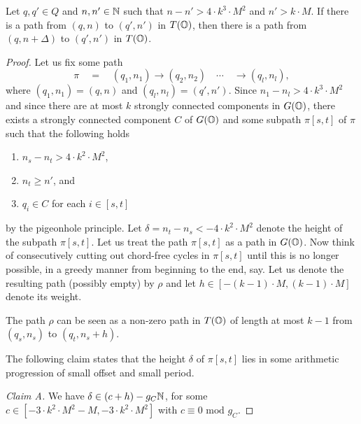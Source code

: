 \documentclass[times,envcountsame]{llncs}
\begin{document}
\begin{lemma}
Let $q,q'\in Q$ and $n,n'\in\mathbb{N}$ such that
$n-n'>4\cdot k^3\cdot M^2$ and
$n'>k\cdot M$.
If there is a path from $(q,n)$ to $(q',n')$ in $T(\mathbb{O})$, then there
is a path from $(q,n+\Delta)$ to $(q',n')$ in $T(\mathbb{O})$.
\end{lemma}
\begin{proof}
Let us fix some path
$$
\pi\quad=\quad(q_1,n_1)\rightarrow(q_2,n_2)\quad \cdots\quad \rightarrow (q_l,n_l),
$$
where $(q_1,n_1)=(q,n)$ and $(q_l,n_l)=(q',n')$.
Since $n_1-n_l>4\cdot k^3\cdot M^2$ and since there are at most $k$ strongly connected components in $G(\mathbb{O})$,  there
exists a strongly connected component $C$ of $G(\mathbb{O})$ and some subpath $\pi[s,t]$
of $\pi$ such that the following holds
\begin{enumerate}
\item  $n_s-n_t>4\cdot k^2\cdot M^2$,
\item $n_t\geq n'$, and
\item $q_i\in C$ for each $i\in[s,t]$
\end{enumerate}
by the pigeonhole principle.
Let $\delta=n_t-n_s<-4\cdot k^2\cdot M^2$ denote the height of the subpath $\pi[s,t]$.
Let us treat the path $\pi[s,t]$ as a path in $G(\mathbb{O})$. Now think of consecutively cutting out
chord-free cycles in $\pi[s,t]$  until this is no longer possible, in a greedy
manner from beginning to the end, say. Let us denote the resulting
path (possibly empty) by $\rho$ and let  $h\in[-(k-1)\cdot M,(k-1)\cdot M]$ denote
its weight.
\begin{remark}{\label{R rho}}
The path $\rho$ can be seen as a non-zero path in $T(\mathbb{O})$ of length at most
$k-1$ from $(q_s,n_s)$ to $(q_t,n_s+h)$.
\end{remark}

\noindent
The following claim states that the height $\delta$ of $\pi[s,t]$ lies in some
arithmetic progression of small offset and small period.


\smallskip

\noindent
{\em Claim A.} We have $\delta\in (c+h)-g_C\mathbb{N}$,
for some
$c\in[-3\cdot k^2\cdot M^2-M,-3\cdot k^2\cdot M^2]$ with $c\equiv 0\text{ mod }g_C$.

\medskip


\end{proof}
\end{document}
